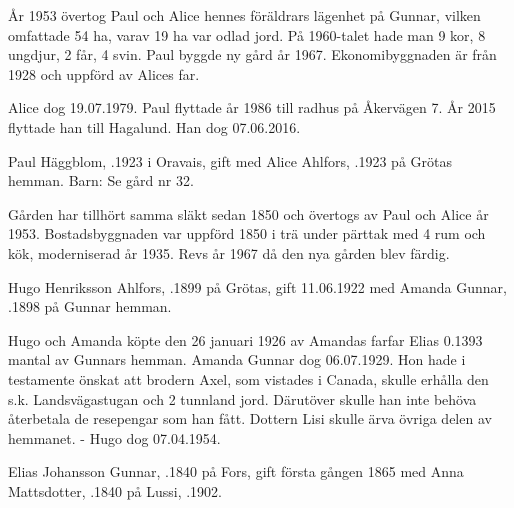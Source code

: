År 1953 övertog Paul och Alice hennes föräldrars lägenhet på Gunnar, vilken omfattade 54 ha, varav 19 ha var odlad jord. På 1960-talet hade man 9 kor, 8 ungdjur, 2 får, 4 svin. Paul byggde ny gård år 1967. Ekonomibyggnaden är från 1928 och uppförd av Alices far.

Alice dog 19.07.1979. Paul flyttade år 1986 till radhus på Åkervägen 7. År 2015 flyttade han till Hagalund. Han dog 07.06.2016.




Paul Häggblom, .1923 i Oravais, gift med Alice Ahlfors, .1923 på Grötas hemman. Barn: Se gård nr 32.

Gården har tillhört samma släkt sedan 1850 och övertogs av Paul och Alice år 1953. Bostadsbyggnaden var uppförd 1850 i trä under pärttak med 4 rum och kök, moderniserad år 1935. Revs år 1967 då den nya gården blev färdig.


Hugo Henriksson Ahlfors, .1899 på Grötas, gift 11.06.1922 med Amanda Gunnar, .1898 på Gunnar hemman.
\begin{jhchildren}
  \item {}
  \item {}
\end{jhchildren}

Hugo och Amanda köpte den 26 januari 1926 av Amandas farfar Elias 0.1393 mantal av Gunnars hemman. Amanda Gunnar dog 06.07.1929. Hon hade i testamente önskat att brodern Axel, som vistades i Canada, skulle erhålla den s.k. Landsvägastugan och 2 tunnland jord. Därutöver skulle han inte behöva återbetala de resepengar som han fått. Dottern Lisi skulle ärva övriga delen av hemmanet. - Hugo dog 07.04.1954.



Elias Johansson Gunnar, .1840 på Fors, gift första gången 1865 med Anna Mattsdotter, .1840 på Lussi, .1902.
\begin{jhchildren}
  \item {}
  \item {}
  \item {}
\end{jhchildren}

